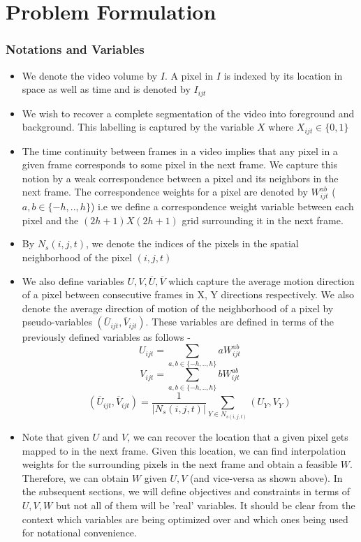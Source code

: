 \section{Problem Formulation}
\label{sec:ProbForm}
\subsubsection*{Notations and Variables}
\begin{itemize}
\item We denote the video volume by $I$. A pixel in $I$ is indexed by
its location in space as well as time and is denoted by $I_{ijt}$
\item We wish to recover a complete segmentation of the video into foreground
and background. This labelling is captured by the variable $X$ where
$X_{ijt}\in\{0,1\}$
\item The time continuity between frames in a video implies that any pixel
in a given frame corresponds to some pixel in the next frame. We capture
this notion by a weak correspondence between a pixel and its neighbors
in the next frame. The correspondence weights for a pixel are denoted
by $W_{ijt}^{ab}$ ($a,b\in\{-h,..,h\}$) i.e we define a correspondence
weight variable between each pixel and the $(2h+1)X(2h+1)$ grid surrounding
it in the next frame.
\item By $N_{s}(i,j,t)$, we denote the indices of the pixels in the spatial
neighborhood of the pixel $(i,j,t)$
\item We also define variables $U,V,\overline{U},\overline{V}$ which capture the average motion direction of a pixel between consecutive frames in X, Y directions respectively.
We also denote the average direction of motion of the neighborhood
of a pixel by pseudo-variables $(\overline{U}_{ijt},\overline{V}_{ijt}).$ These
variables are defined in terms of the previously defined variables
as follows -
\begin{equation}
U_{ijt}=\underset{a,b\in\{-h,..,h\}}{\sum}aW_{ijt}^{ab}
\end{equation}
\begin{equation}
V_{ijt}=\underset{a,b\in\{-h,..,h\}}{\sum}bW_{ijt}^{ab}
\end{equation}
\begin{equation}
(\overline{U}_{ijt},\overline{V}_{ijt})=\frac{1}{|N_{s}(i,j,t)|}\underset{Y\in N_{s(i,j,t)}}{\sum}(U_{Y},V_{Y})
\end{equation}

\item Note that given $U$ and  $V$, we can recover the location that a given pixel gets mapped to in the next frame. Given this location, we can find interpolation weights for the surrounding pixels in the next frame and obtain a feasible $W$. Therefore, we can obtain $W$ given $U,V$ (and vice-versa as shown above). In the subsequent sections, we will define objectives and constraints in terms of $U,V,W$ but not all of them will be 'real' variables. It should be clear from the context which variables are being optimized over and which ones being used for notational convenience.

\end{itemize}

